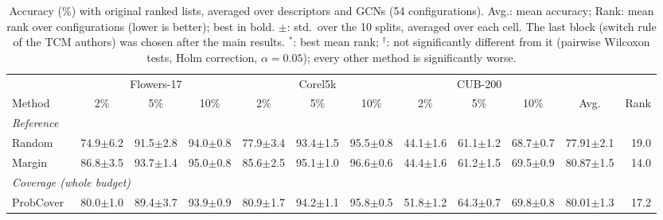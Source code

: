 \begin{table}[t]
\centering
\caption{Accuracy (\%) with original ranked lists, averaged over descriptors and GCNs (54 configurations). Avg.: mean accuracy; Rank: mean rank over configurations (lower is better); best in bold. $\pm$: std.\ over the 10 splits, averaged over each cell. The last block (switch rule of the TCM authors) was chosen after the main results. $^{*}$: best mean rank; $^{\dagger}$: not significantly different from it (pairwise Wilcoxon tests, Holm correction, $\alpha=0.05$); every other method is significantly worse.}
\label{tab:sota-none-std}
\footnotesize
\setlength{\tabcolsep}{3.5pt}
\begin{adjustbox}{max width=\textwidth}
\begin{tabular}{lrrrrrrrrrrr}
\toprule
& \multicolumn{3}{c}{Flowers-17} & \multicolumn{3}{c}{Corel5k} & \multicolumn{3}{c}{CUB-200} & & \\
\cmidrule(lr){2-4}\cmidrule(lr){5-7}\cmidrule(lr){8-10}
Method & \multicolumn{1}{c}{2\%} & \multicolumn{1}{c}{5\%} & \multicolumn{1}{c}{10\%} & \multicolumn{1}{c}{2\%} & \multicolumn{1}{c}{5\%} & \multicolumn{1}{c}{10\%} & \multicolumn{1}{c}{2\%} & \multicolumn{1}{c}{5\%} & \multicolumn{1}{c}{10\%} & \multicolumn{1}{c}{Avg.} & \multicolumn{1}{c}{Rank} \\
\midrule
\multicolumn{12}{l}{\textit{Reference}} \\
\quad Random & 74.9{\scriptsize$\pm$6.2} & 91.5{\scriptsize$\pm$2.8} & 94.0{\scriptsize$\pm$0.8} & 77.9{\scriptsize$\pm$3.4} & 93.4{\scriptsize$\pm$1.5} & 95.5{\scriptsize$\pm$0.8} & 44.1{\scriptsize$\pm$1.6} & 61.1{\scriptsize$\pm$1.2} & 68.7{\scriptsize$\pm$0.7} & 77.91{\scriptsize$\pm$2.1} & 19.0 \\
\quad Margin~\cite{scheffer2001active} & 86.8{\scriptsize$\pm$3.5} & 93.7{\scriptsize$\pm$1.4} & 95.0{\scriptsize$\pm$0.8} & 85.6{\scriptsize$\pm$2.5} & 95.1{\scriptsize$\pm$1.0} & 96.6{\scriptsize$\pm$0.6} & 44.4{\scriptsize$\pm$1.6} & 61.2{\scriptsize$\pm$1.5} & 69.5{\scriptsize$\pm$0.9} & 80.87{\scriptsize$\pm$1.5} & 14.0 \\
\multicolumn{12}{l}{\textit{Coverage (whole budget)}} \\
\quad ProbCover~\cite{yehuda2022active} & 80.0{\scriptsize$\pm$1.0} & 89.4{\scriptsize$\pm$3.7} & 93.9{\scriptsize$\pm$0.9} & 80.9{\scriptsize$\pm$1.7} & 94.2{\scriptsize$\pm$1.1} & 95.8{\scriptsize$\pm$0.5} & 51.8{\scriptsize$\pm$1.2} & 64.3{\scriptsize$\pm$0.7} & 69.8{\scriptsize$\pm$0.8} & 80.01{\scriptsize$\pm$1.3} & 17.2 \\

\end{tabular}
\end{adjustbox}
\end{table}
